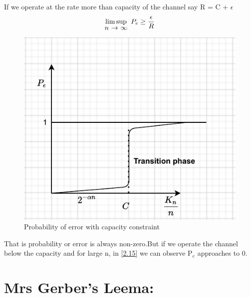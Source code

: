 \documentclass{article}
\begin{document}
  If we operate at the rate more than capacity of the channel say R = C + $\epsilon$
  \begin{align}
  	\stackunder{$\limsup$}{$n$ $\rightarrow$ $\infty$} \hspace{5pt} P_{e} \geq \frac{\epsilon}{R} 
  \end{align}
\begin{figure}[h!]
	\centering
	\includegraphics[height=.20\textheight]{pic7.1.pdf}
	\caption{Probability of error with capacity constraint }
	\label{fig11.2}
\end{figure}
That is probability or error  is always non-zero.But if we operate the channel  below the capacity and for large n, in \eqref{2.15} we can observe P$_{e}$  approaches to 0.  
  
  \section{Mrs Gerber's Leema:}
\end{document}
